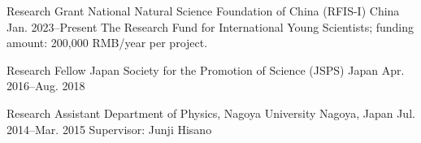 \cventry
  {Research Grant}
  {National Natural Science Foundation of China (RFIS-I)}
  {China}
  {Jan. 2023--Present}
  {
    {\small The Research Fund for International Young Scientists; funding amount: 200,000 RMB/year per project.}
  }

\cventry
  {Research Fellow}
  {Japan Society for the Promotion of Science (JSPS)}
  {Japan}
  {Apr. 2016--Aug. 2018}
  {}

\cventry
  {Research Assistant}
  {Department of Physics, Nagoya University}
  {Nagoya, Japan}
  {Jul. 2014--Mar. 2015}
  {
    {\small Supervisor: Junji Hisano}
  }